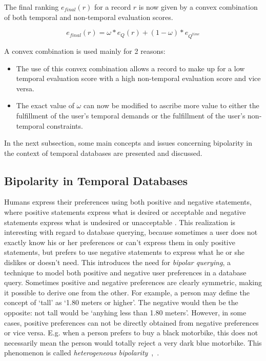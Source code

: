 
The final ranking $e_{final}(r)$ for a record $r$ is now given by a convex combination of both temporal and non-temporal evaluation scores.

\begin{equation}
\label{eq:convex-combination}
e_{final} \left( r \right) = \omega \ast e_{Q} \left( r \right) + \left( 1- \omega \right) \ast e_{Q^{time}}
\end{equation}

A convex combination is used mainly for 2 reasons:
\begin{itemize}
	\item The use of this convex combination allows a record to make up for a low temporal evaluation score with a high non-temporal evaluation score and vice versa.
	\item The exact value of $\omega$ can now be modified to ascribe more value to either the fulfillment of the user's temporal demands or the fulfillment of the user's non-temporal constraints.
\end{itemize}

In the next subsection, some main concepts and issues concerning bipolarity in the context of temporal databases are presented and discussed.

\subsection{Bipolarity in Temporal Databases}
\label{subsubsec:bipolarity}
Humans express their preferences using both positive and negative statements, where positive statements express what is desired or acceptable and negative statements express what is undesired or unacceptable \cite{Billiet:Pons:Matthe:DeTre:Pons:2011:BipolarFuzzy}. This realization is interesting with regard to database querying, because sometimes a user does not exactly know his or her preferences or can't express them in only positive statements, but prefers to use negative statements to express what he or she dislikes or doesn't need. This introduces the need for \emph{bipolar querying}, a technique to model both positive and negative user preferences in a database query. Sometimes positive and negative preferences are clearly symmetric, making it possible to derive one from the other. For example, a person may define the concept of `tall' as `1.80 meters or higher'. The negative would then be the opposite: not tall would be `anyhing less than 1.80 meters'. However, in some cases, positive preferences can not be directly obtained from negative preferences or vice versa. E.g. when a person prefers to buy a black motorbike, this does not necessarily mean the person would totally reject a very dark blue motorbike. This phenomenon is called \emph{heterogeneous bipolarity}~\cite{Dubois2006},~\cite{Dubois2008}.

